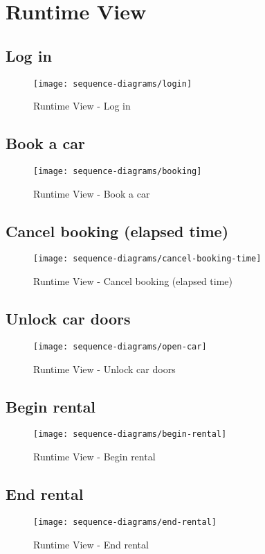 \section{Runtime View}

\subsection*{Log in}
\begin{figure}[H]
	\centering
	\texttt{[image: sequence-diagrams/login]}
	\caption[Runtime View - Log in]{Runtime View - Log in}
	\label{fig:login}
\end{figure}

\subsection*{Book a car}
\begin{figure}[H]
	\centering
	\texttt{[image: sequence-diagrams/booking]}
	\caption[Runtime View - Book a car]{Runtime View - Book a car}
	\label{fig:booking}
\end{figure}

\subsection*{Cancel booking (elapsed time)}
\begin{figure}[H]
	\centering
	\texttt{[image: sequence-diagrams/cancel-booking-time]}
	\caption[Runtime View - Cancel booking (elapsed time)]{Runtime View - Cancel booking (elapsed time)}
	\label{fig:cancel-booking-time}
\end{figure}

\subsection*{Unlock car doors}
\begin{figure}[H]
	\centering
	\texttt{[image: sequence-diagrams/open-car]}
	\caption[Runtime View - Unlock car doors]{Runtime View - Unlock car doors}
	\label{fig:open-car}
\end{figure}

\subsection*{Begin rental}
\begin{figure}[H]
	\centering
	\texttt{[image: sequence-diagrams/begin-rental]}
	\caption[Runtime View - Begin rental]{Runtime View - Begin rental}
	\label{fig:begin-rental}
\end{figure}

\subsection*{End rental}
\begin{figure}[H]
	\centering
	\texttt{[image: sequence-diagrams/end-rental]}
	\caption[Runtime View - End rental]{Runtime View - End rental}
	\label{fig:end-rental}
\end{figure}